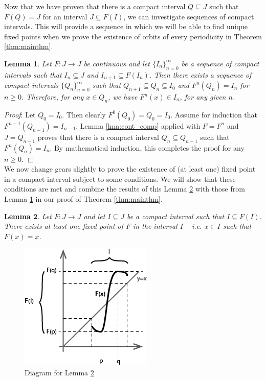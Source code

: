 \documentclass[12pt]{IEEEtran}
\newtheorem{lma}{Lemma}
\begin{document}
Now that we have proven that there is a compact interval $Q \subseteq J$ such that $F(Q) = J$ for an interval $J \subseteq F(I)$, we can investigate sequences of compact intervals. This will provide a sequence in which we will be able to find unique fixed points when we prove the existence of orbits of every periodicity in Theorem \ref{thm:mainthm}.

\begin{lma}
\label{lma:setsequence}
	Let $F : J \rightarrow J$ be continuous and let $\{I_n\}_{n=0}^{\infty}$ be a sequence of compact intervals such that $I_n \subseteq J$ and $I_{n+1} \subseteq F \left( I_n \right)$. Then there exists a sequence of compact intervals $\{Q_n\}_{n=0}^{\infty}$ such that $Q_{n+1} \subseteq Q_n \subseteq I_0$ and $F^n \left( Q_n \right) = I_n$ for $n \geq 0$. Therefore, for any $x \in Q_n$, we have $F^n \left( x \right) \in I_n$, for any given $n$.
\end{lma}

{\it Proof}: Let $Q_0 = I_0$. Then clearly $F^0 \left( Q_0 \right) = Q_0 = I_0$. Assume for induction that $F^{n-1} \left( Q_{n-1} \right) = I_{n-1}$. Lemma \ref{lma:cont_comp} applied with $F = F^n$ and $J = Q_{n-1}$ proves that there is a compact interval $Q_n \subseteq Q_{n-1}$ such that $F^n \left( Q_n \right) = I_n$. By mathematical induction, this completes the proof for any $n \geq 0$. $\Box$
\\

We now change gears slightly to prove the existence of (at least one) fixed point in a compact interval subject to some conditions. We will show that these conditions are met and combine the results of this Lemma \ref{lma:fixedpoint} with those from Lemma \ref{lma:setsequence} in our proof of Theorem \ref{thm:mainthm}.

\begin{lma}
\label{lma:fixedpoint}
	Let $F : J \rightarrow J$ and let $I \subseteq J$ be a compact interval such that $I \subseteq F \left( I \right)$. There exists at least one fixed point of $F$ in the interval $I$ -- i.e. $x \in I$ such that $F \left( x \right) = x$.
\end{lma}

\begin{figure}
	\begin{center}
		\includegraphics{img/fixedpoint_graph.png}
		\caption{Diagram for Lemma \ref{lma:fixedpoint}}
        \label{fig:fixedpoint_graph}
	\end{center}
\end{figure}
\end{document}
